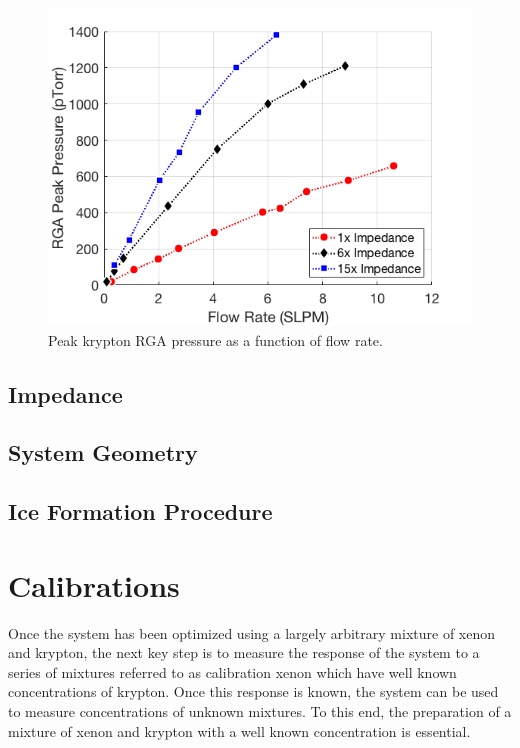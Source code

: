 \documentclass[12pt]{article}
\begin{document}
\begin{figure}[h]
  \includegraphics[width=\linewidth]{Figures/FlowResponse.png}
  \caption{Peak krypton RGA pressure as a function of flow rate.  }
  \label{fig:flowresponse1x}
\end{figure}

\subsection{Impedance}

\subsection{System Geometry}
\label{sec:geometry}

\subsection{Ice Formation Procedure}

\section{Calibrations}
Once the system has been optimized using a largely arbitrary mixture of xenon and krypton, the next key step is to measure the response of the system to a series of mixtures referred to as calibration xenon which have well known concentrations of krypton. Once this response is known, the system can be used to measure concentrations of unknown mixtures. To this end, the preparation of a mixture of xenon and krypton with a well known concentration is essential.
\end{document}
